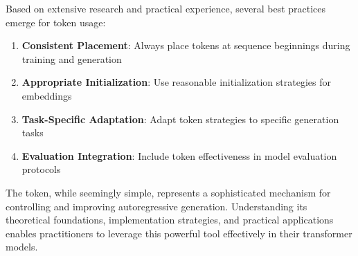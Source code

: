 Based on extensive research and practical experience, several best practices emerge for \sos{} token usage:

\begin{enumerate}
\item \textbf{Consistent Placement}: Always place \sos{} tokens at sequence beginnings during training and generation
\item \textbf{Appropriate Initialization}: Use reasonable initialization strategies for \sos{} embeddings
\item \textbf{Task-Specific Adaptation}: Adapt \sos{} token strategies to specific generation tasks
\item \textbf{Evaluation Integration}: Include \sos{} token effectiveness in model evaluation protocols
\end{enumerate}

The \sos{} token, while seemingly simple, represents a sophisticated mechanism for controlling and improving autoregressive generation. Understanding its theoretical foundations, implementation strategies, and practical applications enables practitioners to leverage this powerful tool effectively in their transformer models.